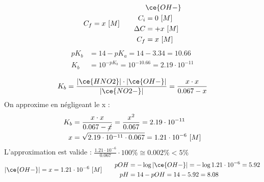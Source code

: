 \documentclass[
  11pt,
  french,
  a4paper,
  openany]{book}
\begin{document}
\begin{Answer}
\begin{enumerate}
\[\begin{split}
  C_f &= x\ [M] \\
  \end{split}
  \qquad
  \begin{split}
  &\ce{OH-}\\
  C_i &= 0\ [M] \\
  \Delta C &= + x\ [M] \\
  C_f &= x\ [M] \\
  \end{split}
  \]
  \[
  \begin{split}
  pK_b &= 14 - pK_a = 14 - 3.34 = 10.66 \\
  K_b &= 10^{-pK_b} = 10^{-10.66} = 2.19 \cdot 10^{-11} \\
  \end{split}
  \]
  \[
  K_b = \frac{|\ce{HNO2}| \cdot |\ce{OH-}|}{|\ce{NO2-}|} = \frac{x \cdot x}{0.067 - x}
  \]
  On approxime en négligeant le x :
  \[
  \begin{split}
  K_b &= \frac{x \cdot x}{0.067 - \cancel{x}} = \frac{x^2}{0.067} = 2.19 \cdot 10^{-11} \\
  x &= \sqrt{2.19 \cdot 10^{-11} \cdot 0.067} = 1.21 \cdot 10^{-6}\ [M]
  \end{split}
  \]
  L'approximation est valide : \(\frac{1.21 \cdot 10^{-6}}{0.067} \cdot 100\% \cong 0.002\% < 5\%\)
  \[
  \begin{split}
  |\ce{OH-}| = x = 1.21 \cdot 10^{-6}\ [M] 
  \end{split}
  \qquad
  \begin{split}
  pOH &= - \log |\ce{OH-}| = - \log 1.21 \cdot 10^{-6} = 5.92 \\
  pH &= 14 - pOH = 14 - 5.92 = 8.08
  \end{split}
  \]
\end{enumerate}


\end{Answer}
\end{document}
